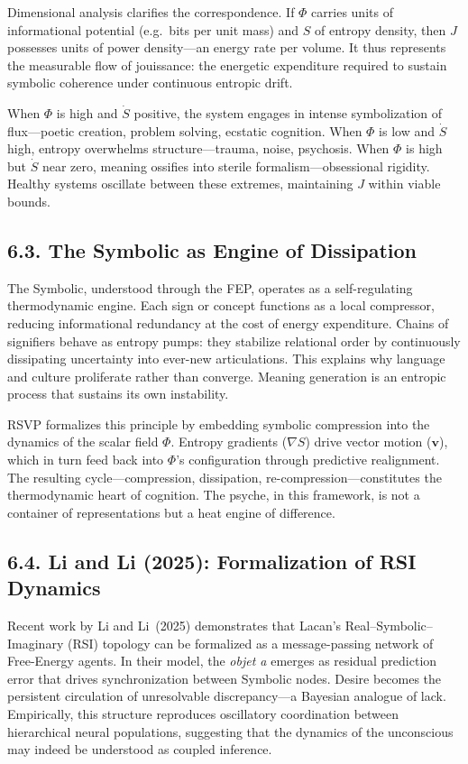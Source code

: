 \documentclass[12pt,a4paper]{article}
\begin{document}
Dimensional analysis clarifies the correspondence.  
If \(\Phi\) carries units of informational potential (e.g.\ bits per unit mass) and \(S\) of entropy density, then \(J\) possesses units of power density—an energy rate per volume.  
It thus represents the measurable flow of jouissance: the energetic expenditure required to sustain symbolic coherence under continuous entropic drift.

When \(\Phi\) is high and \(\dot S\) positive, the system engages in intense symbolization of flux—poetic creation, problem solving, ecstatic cognition.  
When \(\Phi\) is low and \(\dot S\) high, entropy overwhelms structure—trauma, noise, psychosis.  
When \(\Phi\) is high but \(\dot S\) near zero, meaning ossifies into sterile formalism—obsessional rigidity.  
Healthy systems oscillate between these extremes, maintaining \(J\) within viable bounds.

\subsection{6.3. The Symbolic as Engine of Dissipation}

The Symbolic, understood through the FEP, operates as a self-regulating thermodynamic engine.  
Each sign or concept functions as a local compressor, reducing informational redundancy at the cost of energy expenditure.  
Chains of signifiers behave as entropy pumps: they stabilize relational order by continuously dissipating uncertainty into ever-new articulations.  
This explains why language and culture proliferate rather than converge.  
Meaning generation is an entropic process that sustains its own instability.

RSVP formalizes this principle by embedding symbolic compression into the dynamics of the scalar field \(\Phi\).  
Entropy gradients (\(\nabla S\)) drive vector motion (\(\mathbf{v}\)), which in turn feed back into \(\Phi\)’s configuration through predictive realignment.  
The resulting cycle—compression, dissipation, re-compression—constitutes the thermodynamic heart of cognition.  
The psyche, in this framework, is not a container of representations but a heat engine of difference.

\subsection{6.4. Li and Li (2025): Formalization of RSI Dynamics}

Recent work by Li and Li~(2025) demonstrates that Lacan’s Real–Symbolic–Imaginary (RSI) topology can be formalized as a message-passing network of Free-Energy agents.  
In their model, the \emph{objet a} emerges as residual prediction error that drives synchronization between Symbolic nodes.  
Desire becomes the persistent circulation of unresolvable discrepancy—a Bayesian analogue of lack.  
Empirically, this structure reproduces oscillatory coordination between hierarchical neural populations, suggesting that the dynamics of the unconscious may indeed be understood as coupled inference.
\end{document}
